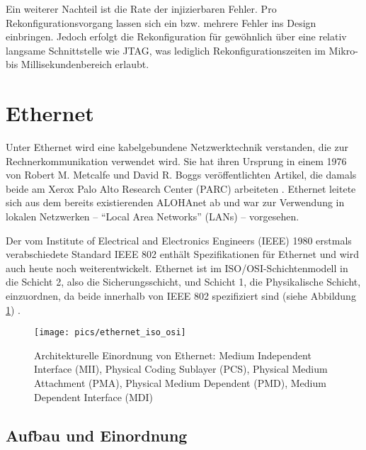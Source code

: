 Ein weiterer Nachteil ist die Rate der injizierbaren Fehler. Pro
Rekonfigurationsvorgang lassen sich ein bzw. mehrere Fehler ins Design
einbringen. Jedoch erfolgt die Rekonfiguration für gewöhnlich über
eine relativ langsame Schnittstelle wie JTAG, was
lediglich Rekonfigurationszeiten im Mikro- bis Millisekundenbereich erlaubt.

\section{Ethernet}
Unter Ethernet wird eine kabelgebundene Netzwerktechnik verstanden,
die zur Rechnerkommunikation verwendet wird. Sie hat ihren Ursprung in
einem 1976 von Robert M. Metcalfe und David R. Boggs veröffentlichten
Artikel, die damals beide am Xerox Palo Alto Research Center (PARC)
arbeiteten \cite{metcalfe1976}. Ethernet leitete sich aus dem bereits
existierenden ALOHAnet ab und war zur Verwendung in lokalen Netzwerken
-- ``Local Area Networks'' (LANs) -- vorgesehen. 

Der vom Institute of Electrical and Electronics Engineers (IEEE) 1980
erstmals verabschiedete Standard IEEE 802 enthält Spezifikationen für
Ethernet und wird auch heute noch weiterentwickelt. Ethernet ist im
ISO/OSI-Schichtenmodell in die Schicht 2, also die Sicherungsschicht,
und Schicht 1, die Physikalische Schicht, einzuordnen, da beide
innerhalb von IEEE 802 spezifiziert sind (siehe Abbildung
\ref{fig:grundlagen_ethernet_osi}) \cite[S. 38 ff.]{norris2002}.

\begin{figure}[htbp]
	\centering
	\texttt{[image: pics/ethernet\_iso\_osi]}
	\caption[Architekturelle Einordnung von
        Ethernet]{Architekturelle Einordnung von Ethernet: Medium
          Independent Interface (MII), Physical Coding Sublayer (PCS),
          Physical Medium Attachment (PMA), Physical Medium Dependent
          (PMD), Medium Dependent Interface (MDI)}
	\label{fig:grundlagen_ethernet_osi}
\end{figure}

\subsection{Aufbau und Einordnung}
\label{sec:grundlagen_ethernet_aufbau}

